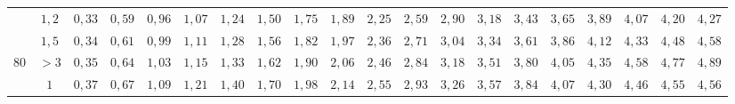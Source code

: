 \begin{table}[]
{\begin{tabular}{|c|c|c|c|c|c|c|c|c|c|c|c|c|c|c|c|c|c|c|c|}
                        & $1,2$                                                                               & \cellcolor[HTML]{FFCCC9}$0,33$ & \cellcolor[HTML]{FFCCC9}$0,59$ & \cellcolor[HTML]{FFCCC9}$0,96$ & \cellcolor[HTML]{FFCCC9}$1,07$ & \cellcolor[HTML]{FFCCC9}$1,24$ & \cellcolor[HTML]{FD6864}$1,50$ & \cellcolor[HTML]{FD6864}$1,75$ & \cellcolor[HTML]{FD6864}$1,89$ & \cellcolor[HTML]{FD6864}$2,25$ & \cellcolor[HTML]{FE0000}$2,59$ & \cellcolor[HTML]{FE0000}$2,90$ & \cellcolor[HTML]{FE0000}$3,18$ & \cellcolor[HTML]{CB0000}$3,43$                        & \cellcolor[HTML]{CB0000}$3,65$ & \cellcolor[HTML]{CB0000}$3,89$ & \cellcolor[HTML]{9A0000}$4,07$ & \cellcolor[HTML]{9A0000}$4,20$ & \cellcolor[HTML]{F8A102}$4,27$ \\ \cline{2-20} 
                        & $1,5$                                                                               & \cellcolor[HTML]{FFCCC9}$0,34$ & \cellcolor[HTML]{FFCCC9}$0,61$ & \cellcolor[HTML]{FFCCC9}$0,99$ & \cellcolor[HTML]{FFCCC9}$1,11$ & \cellcolor[HTML]{FFCCC9}$1,28$ & \cellcolor[HTML]{FD6864}$1,56$ & \cellcolor[HTML]{FD6864}$1,82$ & \cellcolor[HTML]{FD6864}$1,97$ & \cellcolor[HTML]{FD6864}$2,36$ & \cellcolor[HTML]{FE0000}$2,71$ & \cellcolor[HTML]{FE0000}$3,04$ & \cellcolor[HTML]{FE0000}$3,34$ & \cellcolor[HTML]{CB0000}$3,61$                        & \cellcolor[HTML]{CB0000}$3,86$ & \cellcolor[HTML]{CB0000}$4,12$ & \cellcolor[HTML]{9A0000}$4,33$ & \cellcolor[HTML]{9A0000}$4,48$ & \cellcolor[HTML]{F8A102}$4,58$ \\ \cline{2-20} 
\multirow{-5}{*}{$80$}  & $>3$                                                                                & \cellcolor[HTML]{FFCCC9}$0,35$ & \cellcolor[HTML]{FFCCC9}$0,64$ & \cellcolor[HTML]{FFCCC9}$1,03$ & \cellcolor[HTML]{FFCCC9}$1,15$ & \cellcolor[HTML]{FFCCC9}$1,33$ & \cellcolor[HTML]{FD6864}$1,62$ & \cellcolor[HTML]{FD6864}$1,90$ & \cellcolor[HTML]{FD6864}$2,06$ & \cellcolor[HTML]{FD6864}$2,46$ & \cellcolor[HTML]{FE0000}$2,84$ & \cellcolor[HTML]{FE0000}$3,18$ & \cellcolor[HTML]{FE0000}$3,51$ & \cellcolor[HTML]{CB0000}$3,80$                        & \cellcolor[HTML]{CB0000}$4,05$ & \cellcolor[HTML]{CB0000}$4,35$ & \cellcolor[HTML]{9A0000}$4,58$ & \cellcolor[HTML]{9A0000}$4,77$ & \cellcolor[HTML]{F8A102}$4,89$ \\ \hline
                        & $1$                                                                                 & \cellcolor[HTML]{FFCCC9}$0,37$ & \cellcolor[HTML]{FFCCC9}$0,67$ & \cellcolor[HTML]{FFCCC9}$1,09$ & \cellcolor[HTML]{FFCCC9}$1,21$ & \cellcolor[HTML]{FFCCC9}$1,40$ & \cellcolor[HTML]{FD6864}$1,70$ & \cellcolor[HTML]{FD6864}$1,98$ & \cellcolor[HTML]{FD6864}$2,14$ & \cellcolor[HTML]{FD6864}$2,55$ & \cellcolor[HTML]{FE0000}$2,93$ & \cellcolor[HTML]{FE0000}$3,26$ & \cellcolor[HTML]{CB0000}$3,57$ & \cellcolor[HTML]{CB0000}$3,84$                        & \cellcolor[HTML]{CB0000}$4,07$ & \cellcolor[HTML]{9A0000}$4,30$ & \cellcolor[HTML]{9A0000}$4,46$ & \cellcolor[HTML]{F8A102}$4,55$ & \cellcolor[HTML]{F8A102}$4,56$ \\ \cline{2-20} 

\end{tabular}}
\end{table}
